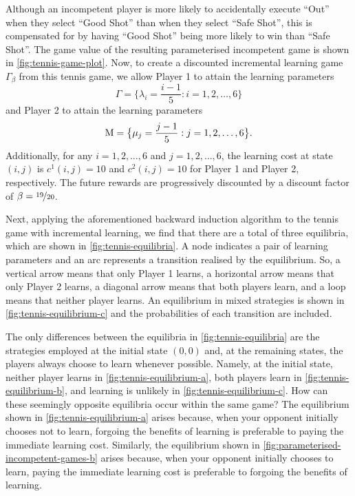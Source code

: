     Although an incompetent player is more likely to accidentally execute ``Out'' when they select ``Good Shot'' than when they select ``Safe Shot'', this is compensated for by having ``Good Shot'' being more likely to win than ``Safe Shot''.
    The game value of the resulting parameterised incompetent game is shown in \autoref{fig:tennis-game-plot}.
    Now, to create a discounted incremental learning game $\Gamma_\beta$ from this tennis game, we allow Player 1 to attain the learning parameters
    \[
        \Gamma
            =
            \big\{ \lambda_i = \frac{i - 1}{5} : i = 1, 2, \ldots, 6 \big\}
    \]
    and Player 2 to attain the learning parameters
    \[
        \mathrm{M}
            =
            \big\{ \mu_j = \frac{j - 1}{5} : j = 1, 2, \ldots, 6 \big\}.
    \]
    Additionally, for any $i = 1, 2, \ldots, 6$ and $j = 1, 2, \ldots, 6$, the learning cost at state $(i, j)$ is $c^1(i, j) = 10$ and $c^2(i, j) = 10$ for Player 1 and Player 2, respectively.
    The future rewards are progressively discounted by a discount factor of $\beta = \nicefrac{19}{20}$.

    Next, applying the aforementioned backward induction algorithm to the tennis game with incremental learning, we find that there are a total of three equilibria, which are shown in \autoref{fig:tennis-equilibria}.
    A node indicates a  pair of learning parameters and an arc represents a transition realised by the equilibrium.
    So, a vertical arrow means that only Player 1 learns, a horizontal arrow means that only Player 2 learns, a diagonal arrow means that both players learn, and a loop means that neither player learns.
    An equilibrium in mixed strategies is shown in \autoref{fig:tennis-equilibrium-c} and the probabilities of each transition are included.

    The only differences between the equilibria in \autoref{fig:tennis-equilibria} are the strategies employed at the initial state $(0, 0)$ and, at the remaining states, the players always choose to learn whenever possible.
    Namely, at the initial state, neither player learns in \autoref{fig:tennis-equilibrium-a}, both players learn in \autoref{fig:tennis-equilibrium-b}, and learning is unlikely in \autoref{fig:tennis-equilibrium-c}.
    How can these seemingly opposite equilibria occur within the same game?
    The equilibrium shown in \autoref{fig:tennis-equilibrium-a} arises because, when your opponent initially chooses not to learn, forgoing the benefits of learning is preferable to paying the immediate learning cost.
    Similarly, the equilibrium shown in \autoref{fig:parameterised-incompetent-games-b} arises because, when your opponent initially chooses to learn, paying the immediate learning cost is preferable to forgoing the benefits of learning.
    
